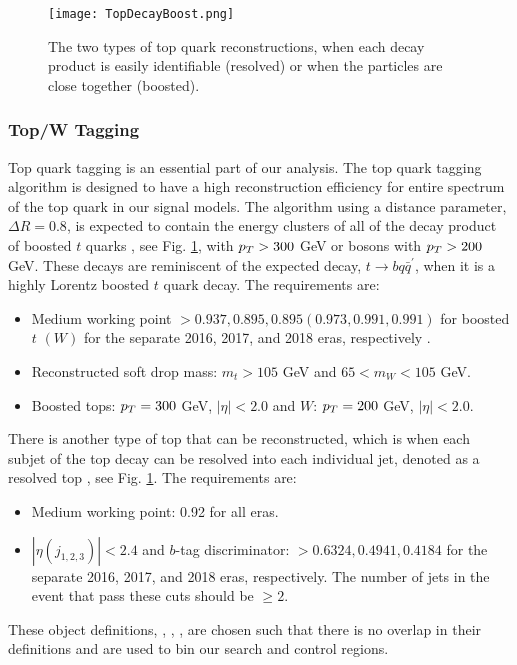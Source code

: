 \begin{figure}
 	\centering
	\texttt{[image: TopDecayBoost.png]}
 	\caption[Top Decays]{The two types of top quark reconstructions, when each decay product is easily identifiable (resolved) or when the particles are close together (boosted).}
 	\label{TopDecays} 
\end{figure}

\subsubsection{Top/W Tagging}\label{TopTagging}
Top quark tagging is an essential part of our analysis. The top quark tagging algorithm is designed to have a high reconstruction efficiency for entire \pt{} spectrum of the top quark in our signal models. The \antikt{} algorithm using a distance parameter, $\Delta R=0.8$, is expected to contain the energy clusters of all of the decay product of boosted $t$ quarks \cite{noauthor_top_nodate, noauthor_identification_nodate-1}, see Fig. \ref{TopDecays}, with $p_{T}>300$ GeV or \W{} bosons with $p_{T}>200$ GeV. These decays are reminiscent of the expected decay, $t\rightarrow bq\bar{q}^\prime$, when it is a highly Lorentz boosted $t$ quark decay. The requirements are:
\begin{itemize}
	\item Medium working point $>0.937, 0.895, 0.895 (0.973, 0.991, 0.991)$ for boosted $t$ $(W)$ for the separate 2016, 2017, and 2018 eras, respectively \cite{ganin_unsupervised_2015}.
	\item Reconstructed soft drop\cite{larkoski_soft_2014, dasgupta_towards_2013} mass: $m_t>105$ GeV and $65<m_W<105$ GeV.
	\item Boosted tops: $p_{T}=300$ GeV, $|\eta|<2.0$ and $W$: $p_{T}=200$ GeV, $|\eta|<2.0$.
\end{itemize}

There is another type of top that can be reconstructed, which is when each subjet of the top decay can be resolved into each individual jet, denoted as a resolved top \cite{ganin_unsupervised_2015}, see Fig. \ref{TopDecays}. The requirements are:
\begin{itemize}
	\item Medium working point: 0.92 for all eras.
	\item $|\eta(j_{1,2,3})|<2.4$ and $b$-tag discriminator: $>0.6324, 0.4941, 0.4184$ for the separate 2016, 2017, and 2018 eras, respectively. The number of jets in the event that pass these cuts should be $\geq2$.
\end{itemize}
These object definitions, \nt, \nw, \nrt, are chosen such that there is no overlap in their definitions and are used to bin our search and control regions. 

